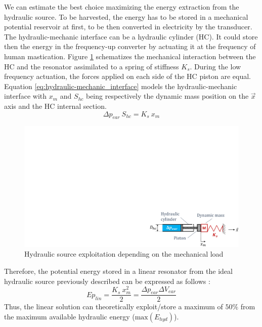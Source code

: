 \documentclass[3p,twocolumn,preprint]{elsarticle}
\begin{document}
We can estimate the best choice maximizing the energy extraction from the hydraulic source. To be harvested, the energy has to be stored in a mechanical potential reservoir at first, to be then converted in electricity by the transducer. The hydraulic-mechanic interface can be a hydraulic cylinder (HC). It could store then the energy in the frequency-up converter by actuating it at the frequency of human mastication. Figure \ref{fig:hydraulic_mechanic_interface} schematizes the mechanical interaction between the HC and the resonator assimilated to a spring of stiffness $K_s$. During the low frequency actuation, the forces applied on each side of the HC piston are equal. Equation \ref{eq:hydraulic-mechanic_interface} models the hydraulic-mechanic interface with $x_{m}$ and $ S_{hc}$ being respectively the dynamic mass position on the $\vec{x}$ axis and the HC internal section.
\begin{equation}
	\Delta p_{ear}\ S_{hc} = K_{s}\ x_{m}
	\label{eq:hydraulic-mechanic_interface}
\end{equation}
\begin{figure}[!htbp]
	\centering
	\captionsetup{justification=centering}
	\includegraphics[trim={19.7cm 0cm 0cm 13cm},clip, width=0.7\linewidth]{figures/hydraulic_mechanic_interface.pdf}
	\caption{Hydraulic source exploitation depending on the mechanical load}
	\label{fig:hydraulic_mechanic_interface}
\end{figure}
Therefore, the potential energy stored in a linear resonator from the ideal hydraulic source previously described can be expressed as follows :
\begin{equation}
	Ep_{lin} = \dfrac{K_s\ x_{m}^2}{2} = \dfrac{\Delta p_{ear} \Delta V_{ear}}{2}
	\label{eq:best_linear_soution}
\end{equation}
Thus, the linear solution can theoretically exploit/store a maximum of $50\%$ from the maximum available hydraulic energy ($\text{max}(E_{hyd})$). 
\end{document}
